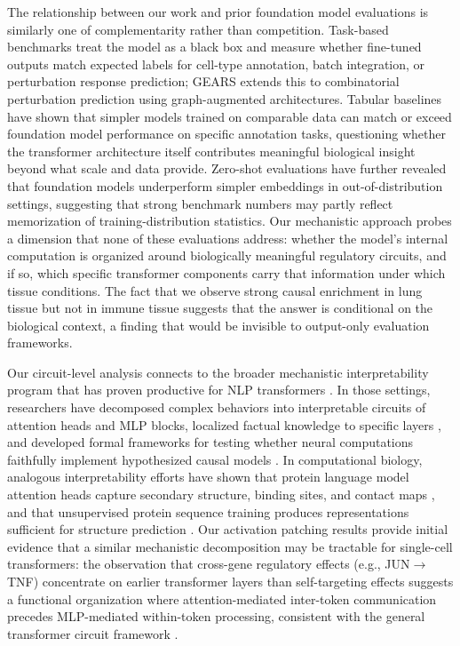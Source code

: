 \documentclass[10pt,letterpaper]{article}
\begin{document}
The relationship between our work and prior foundation model evaluations is
similarly one of complementarity rather than competition. Task-based benchmarks
\cite{cui_scgpt_2023,theodoris_geneformer_2023,hao_scfoundation_2024} treat
the model as a black box and measure whether fine-tuned outputs match expected
labels for cell-type annotation, batch integration, or perturbation response
prediction; GEARS \cite{roohani_gears_2024} extends this to combinatorial
perturbation prediction using graph-augmented architectures. Tabular baselines
\cite{fischer_sctab_2024} have shown that simpler models trained on comparable
data can match or exceed foundation model performance on specific annotation
tasks, questioning whether the transformer architecture itself contributes
meaningful biological insight beyond what scale and data provide. Zero-shot
evaluations \cite{kedzierska_zeroshot_2025} have further revealed that
foundation models underperform simpler embeddings in out-of-distribution
settings, suggesting that strong benchmark numbers may partly reflect
memorization of training-distribution statistics. Our mechanistic approach
probes a dimension that none of these evaluations address: whether the model's
internal computation is organized around biologically meaningful regulatory
circuits, and if so, which specific transformer components carry that
information under which tissue conditions. The fact that we observe strong
causal enrichment in lung tissue but not in immune tissue suggests that the
answer is conditional on the biological context, a finding that would be
invisible to output-only evaluation frameworks.

Our circuit-level analysis connects to the broader mechanistic interpretability
program that has proven productive for NLP transformers
\cite{olah_zoom_in_2020,elhage_framework_2021,wang_ioi_2023}. In those
settings, researchers have decomposed complex behaviors into interpretable
circuits of attention heads and MLP blocks, localized factual knowledge to
specific layers \cite{meng_rome_2022}, and developed formal frameworks for
testing whether neural computations faithfully implement hypothesized causal
models \cite{geiger_causal_abstraction_2021}. In computational biology,
analogous interpretability efforts have shown that protein language model
attention heads capture secondary structure, binding sites, and contact maps
\cite{vig_bertology_biology_2021}, and that unsupervised protein sequence
training produces representations sufficient for structure prediction
\cite{rives_esm_2021,lin_esmfold_2023}. Our activation patching results
provide initial evidence that a similar mechanistic decomposition may be
tractable for single-cell transformers: the observation that cross-gene
regulatory effects (e.g., JUN${\rightarrow}$TNF) concentrate on earlier
transformer layers than self-targeting effects suggests a functional
organization where attention-mediated inter-token communication precedes
MLP-mediated within-token processing, consistent with the general transformer
circuit framework \cite{elhage_framework_2021}.
\end{document}
